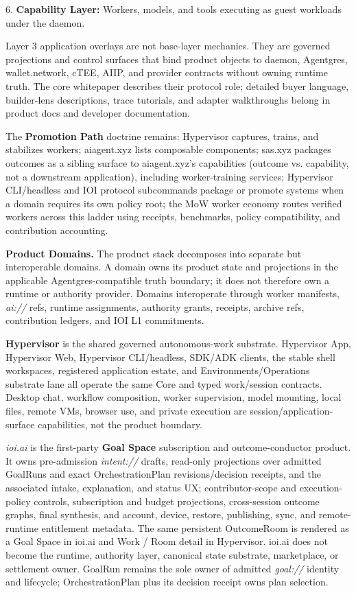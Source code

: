 \documentclass[
  11pt,
]{article}
\begin{document}
6. \textbf{Capability Layer:} Workers, models, and tools executing as
guest workloads under the daemon.

Layer 3 application overlays are not base-layer mechanics. They are
governed projections and control surfaces that bind product objects to
daemon, Agentgres, wallet.network, cTEE, AIIP, and provider contracts
without owning runtime truth. The core whitepaper describes their
protocol role; detailed buyer language, builder-lens descriptions, trace
tutorials, and adapter walkthroughs belong in product docs and developer
documentation.

The \textbf{Promotion Path} doctrine remains: Hypervisor captures,
trains, and stabilizes workers; aiagent.xyz lists composable components;
sas.xyz packages outcomes as a sibling surface to aiagent.xyz's
capabilities (outcome vs. capability, not a downstream application),
  including worker-training services; Hypervisor CLI/headless and IOI
  protocol subcommands package or promote systems when a domain requires
  its own policy root; the MoW worker economy routes
verified workers across this ladder using receipts, benchmarks, policy
compatibility, and contribution accounting.

\textbf{Product Domains.} The product stack decomposes into separate but
interoperable domains. A domain owns its product state and projections in
the applicable Agentgres-compatible truth boundary; it does not therefore
own a runtime or authority provider. Domains interoperate through worker
manifests, \emph{ai://} refs, runtime assignments, authority grants,
receipts, archive refs, contribution ledgers, and IOI L1 commitments.

\textbf{Hypervisor} is the shared governed autonomous-work substrate.
Hypervisor App, Hypervisor Web, Hypervisor CLI/headless, SDK/ADK clients,
the stable shell workspaces, registered application estate, and
Environments/Operations substrate lane all operate the same Core and typed
work/session contracts.
Desktop chat, workflow composition, worker supervision, model mounting,
local files, remote VMs, browser use, and private execution are
session/application-surface capabilities, not the product boundary.

\emph{ioi.ai} is the first-party \textbf{Goal Space} subscription and
outcome-conductor product. It owns pre-admission \emph{intent://} drafts,
read-only projections over admitted GoalRuns and exact OrchestrationPlan
revisions/decision receipts, and the associated intake, explanation, and status UX;
contributor-scope and execution-policy controls, subscription and budget
projections, cross-session outcome graphs, final synthesis, and account,
device, restore, publishing, sync, and remote-runtime entitlement
metadata. The same persistent OutcomeRoom is rendered as a Goal Space in
ioi.ai and Work / Room detail in Hypervisor. ioi.ai does not become the
runtime, authority layer, canonical state substrate, marketplace, or
settlement owner.
GoalRun remains the sole owner of admitted \emph{goal://} identity and
lifecycle; OrchestrationPlan plus its decision receipt owns plan selection.
\end{document}
